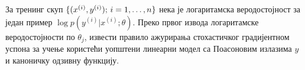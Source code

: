 \item {} За тренинг скуп $\{(x^{(i)}, y^{(i)});\, i=1,\ldots,{n}\}$ нека је логаритамска веродостојност за један пример $\log p(y^{(i)} | x^{(i)}; \theta)$. Преко првог извода логаритамске веродостојности по $\theta_j$, извести правило ажурирања стохастичког градијентном успона за учење користећи уопштени линеарни модел са Поасоновим излазима $y$ и каноничку одзивну функцију.
